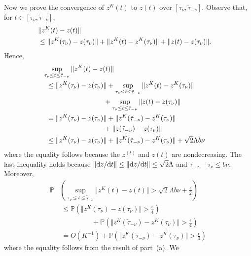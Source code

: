 \documentclass[10pt,journal,letterpaper]{IEEEtran}
\begin{document}
\begin{inparaenum}[(a)]
\item Now we prove the convergence of $z^K(t)$ to $z(t)$ over
$[\tau_{\nu}, \tilde{\tau}_{-\nu}]$.
Observe that, for $t \in [\tau_{\nu}, \tilde{\tau}_{-\nu}]$,
\begin{align*}
\lefteqn{\Vert z^K(t)- z(t) \Vert } \\
&\leq \Vert z^K(\tau_{\nu})- z(\tau_{\nu}) \Vert +  \Vert z^K(t)- z^K(\tau_{\nu}) \Vert
 + \Vert z(t)- z(\tau_{\nu}) \Vert.
\end{align*}
Hence,
\begin{align*}
\lefteqn{\sup_{\tau_{\nu} \leq t \leq \tilde{\tau}_{-\nu}} \Vert z^K(t)- z(t) \Vert} \\
&~\leq \Vert z^K(\tau_{\nu})- z(\tau_{\nu}) \Vert + \sup_{\tau_{\nu} \leq t \leq \tilde{\tau}_{-\nu}} \Vert z^K(t)- z^K(\tau_{\nu}) \Vert \\
&~ \ \ \ \ \ \ \ \ \ \ \ \ \ \ \ \ \ \  \ \ \ \ \ \ \ + \sup_{\tau_{\nu} \leq t \leq \tilde{\tau}_{-\nu}} \Vert z(t)- z(\tau_{\nu}) \Vert \\
&~= \Vert z^K(\tau_{\nu})- z(\tau_{\nu}) \Vert + \Vert
z^K(\tilde{\tau}_{-\nu})- z^K(\tau_{\nu}) \Vert \\
&~ \ \ \ \ \ \ \ \ \ \ \ \ \ \ \ \ \ \ \ \ \  \ \ \ \ +  \Vert
z(\tilde{\tau}_{-\nu})- z(\tau_{\nu}) \Vert \\
&~\leq \Vert z^K(\tau_{\nu})- z(\tau_{\nu}) \Vert + \Vert
z^K(\tilde{\tau}_{-\nu})- z^K(\tau_{\nu}) \Vert + \sqrt{2}\Lambda
b\nu
\end{align*}
where the equality follows because the $z^(t)$ and $z(t)$ are
nondecreasing. The last inequality holds because $\Vert{\rm
d}{z}/{\rm d}t\Vert \leq \Vert{\rm d}{\bar{z}}/{\rm d}t\Vert \leq
\sqrt{2}\Lambda$ and $\tilde{\tau}_{-\nu} - \tau_{\nu} \leq b \nu$.
Moreover,
\begin{align*}
\mathbb{P}& \left(\sup_{\tau_{\nu} \leq t \leq \tilde{\tau}_{-\nu}}
 \Vert z^K(t)- z(t) \Vert > \sqrt{2}\Lambda
b\nu + \frac{\epsilon}{2} \right) \\
&~\leq \mathbb{P}\left(\Vert z^K(\tau_{\nu})- z(\tau_{\nu}) \Vert >
\frac{\epsilon}{4} \right) \\
&~ \ \ \ \  \ \ \ \  \ \ \ \ \ \ \ \ \ \ \ \ + \mathbb{P}\left(\Vert
z^K(\tilde{\tau}_{-\nu})- z^K(\tau_{\nu}) \Vert > \frac{\epsilon}{4}
\right) \\
&~=O(K^{-1}) + \mathbb{P}\left(\Vert z^K(\tilde{\tau}_{-\nu})-
z^K(\tau_{\nu}) \Vert > \frac{\epsilon}{4} \right)
\end{align*}
where the equality follows from the result of part~(a). We

\end{inparaenum}
\end{document}
